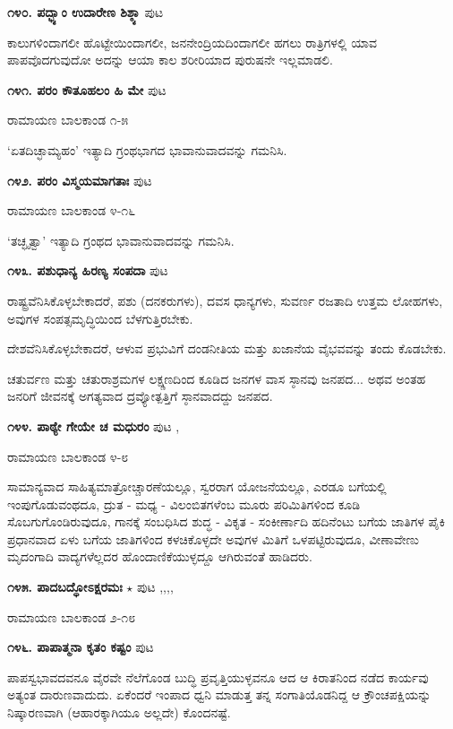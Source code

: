 {\medskip
\noindent\textbf{೧೪೦. ಪದ್ಭ್ಯಾಂ ಉದಾರೇಣ ಶಿಶ್ಠ್ಯಾ} \hfill ಪುಟ \pageref{26}

ಕಾಲುಗಳಿಂದಾಗಲೀ ಹೊಟ್ಟೇಯಿಂದಾಗಲೀ, ಜನನೇಂದ್ರಿಯದಿಂದಾಗಲೀ ಹಗಲು ರಾತ್ರಿಗಳಲ್ಲಿ ಯಾವ ಪಾಪವೊದಗುವುದೋ ಅದನ್ನು ಆಯಾ ಕಾಲ ಶರೀರಿಯಾದ ಪುರುಷನೇ ಇಲ್ಲಮಾಡಲಿ.

\medskip
\noindent\textbf{೧೪೧. ಪರಂ ಕೌತೂಹಲಂ ಹಿ ಮೇ} \hfill ಪುಟ \pageref{163}

\hfill ರಾಮಾಯಣ ಬಾಲಕಾಂಡ ೧-೫

`ಏತದಿಚ್ಛಾಮ್ಯಹಂ' ಇತ್ಯಾದಿ ಗ್ರಂಥಭಾಗದ ಭಾವಾನುವಾದವನ್ನು ಗಮನಿಸಿ.

\medskip
\noindent\textbf{೧೪೨. ಪರಂ ವಿಸ್ಮಯಮಾಗತಾಃ} \hfill ಪುಟ \pageref{211a}

\hfill ರಾಮಾಯಣ ಬಾಲಕಾಂಡ ೪-೧೬

`ತಚ್ಛೃತ್ವಾ' ಇತ್ಯಾದಿ ಗ್ರಂಥದ ಭಾವಾನುವಾದವನ್ನು ಗಮನಿಸಿ.

\medskip
\noindent\textbf{೧೪೩. ಪಶುಧಾನ್ಯ ಹಿರಣ್ಯ ಸಂಪದಾ} \hfill ಪುಟ \pageref{227}

ರಾಷ್ಟ್ರವೆನಿಸಿಕೊಳ್ಳಬೇಕಾದರೆ, ಪಶು (ದನಕರುಗಳು), ದವಸ ಧಾನ್ಯಗಳು, ಸುವರ್ಣ ರಜತಾದಿ ಉತ್ತಮ ಲೋಹಗಳು, ಅವುಗಳ ಸಂಪತ್ಸಮೃದ್ಧಿಯಿಂದ ಬೆಳಗುತ್ತಿರಬೇಕು. 

ದೇಶವೆನಿಸಿಕೊಳ್ಳಬೇಕಾದರೆ, ಆಳುವ ಪ್ರಭುವಿಗೆ ದಂಡನೀತಿಯ ಮತ್ತು ಖಜಾನೆಯ ವೈಭವವನ್ನು ತಂದು ಕೊಡಬೇಕು.

ಚತುರ್ವಣ ಮತ್ತು ಚತುರಾಶ್ರಮಗಳ ಲಕ್ಷ್ಣಣದಿಂದ ಕೂಡಿದ ಜನಗಳ ವಾಸ ಸ್ಠಾನವು ಜನಪದ... ಅಥವ ಅಂತಹ ಜನರಿಗೆ ಜೀವನಕ್ಕೆ ಅಗತ್ಯವಾದ ದ್ರವ್ಯೋತ್ಪತ್ತಿಗೆ ಸ್ಠಾನವಾದದ್ದು ಜನಪದ.

\medskip
\noindent\textbf{೧೪೪. ಪಾಠ್ಯೇ ಗೇಯೇ ಚ ಮಧುರಂ} \hfill ಪುಟ \pageref{164a},\pageref{250}

\hfill ರಾಮಾಯಣ ಬಾಲಕಾಂಡ ೪-೮

ಸಾಮಾನ್ಯವಾದ ಸಾಹಿತ್ಯಮಾತ್ರೋಚ್ಚಾರಣೆಯಲ್ಲೂ, ಸ್ವರರಾಗ ಯೋಜನೆಯಲ್ಲೂ, ಎರಡೂ ಬಗೆಯಲ್ಲಿ ಇಂಪುಗೊಡುವಂಥದೂ, ದ್ರುತ - ಮಧ್ಯ - ವಿಲಂಬಿತಗಳೆಂಬ ಮೂರು ಪರಿಮಿತಿಗಳಿಂದ ಕೂಡಿ ಸೊಬಗುಗೊಂಡಿರುವುದೂ, ಗಾನಕ್ಕೆ ಸಂಬಧಿಸಿದ ಶುದ್ಧ - ವಿಕೃತ - ಸಂಕೀರ್ಣಾದಿ ಹದಿನೆಂಟು ಬಗೆಯ ಜಾತಿಗಳ ಪೈಕಿ ಪ್ರಧಾನವಾದ ಏಳು ಬಗೆಯ ಜಾತಿಗಳಿಂದ ಕಳಚಿಕೊಳ್ಳದೇ ಅವುಗಳ ಮಿತಿಗೆ ಒಳಪಟ್ಟಿರುವುದೂ, ವೀಣಾವೇಣು ಮೃದಂಗಾದಿ ವಾದ್ಯಗಳೆಲ್ಲದರ  ಹೊಂದಾಣಿಕೆಯುಳ್ಳದ್ದೂ ಆಗಿರುವಂತೆ ಹಾಡಿದರು.

\medskip
\noindent\textbf{೧೪೫. ಪಾದಬದ್ಧೋಽಕ್ಷರಮಃ} $\star$ \hfill ಪುಟ \pageref{20a},\pageref{157a},\pageref{201},\pageref{213},\pageref{242}

\hfill ರಾಮಾಯಣ ಬಾಲಕಾಂಡ ೨-೧೮

\medskip
\noindent\textbf{೧೪೬. ಪಾಪಾತ್ಮನಾ ಕೃತಂ ಕಷ್ಟಂ} \hfill ಪುಟ \pageref{203a}

ಪಾಪಸ್ವಭಾವದವನೂ ವೈರವೇ ನೆಲೆಗೊಂಡ ಬುದ್ಧಿ ಪ್ರವೃತ್ತಿಯುಳ್ಳವನೂ ಆದ ಆ ಕಿರಾತನಿಂದ ನಡೆದ ಕಾರ್ಯವು ಅತ್ಯಂತ ದಾರುಣವಾದುದು. ಏಕೆಂದರೆ ಇಂಪಾದ ಧ್ವನಿ ಮಾಡುತ್ತ ತನ್ನ ಸಂಗಾತಿಯೊಡನಿದ್ದ ಆ ಕ್ರೌಂಚಪಕ್ಷಿಯನ್ನು ನಿಷ್ಕಾರಣವಾಗಿ (ಆಹಾರಕ್ಕಾಗಿಯೂ ಅಲ್ಲದೇ) ಕೊಂದನಷ್ಟೆ.

}
